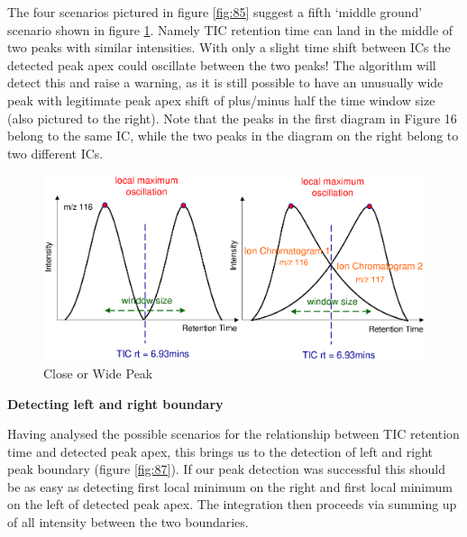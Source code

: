 The four scenarios pictured in figure \ref{fig:85} suggest a fifth ‘middle 
ground’ scenario shown in figure \ref{fig:86}. Namely TIC retention time can 
land in the middle of two peaks with similar intensities. With only a slight 
time shift between ICs the detected peak apex could oscillate between the two 
peaks! The algorithm will detect this and raise a warning, as it is still 
possible to have an unusually wide peak with legitimate peak apex shift of 
plus/minus half the time window size (also pictured to the right). Note that 
the peaks in the first diagram in Figure 16 belong to the same IC, while the 
two peaks in the diagram on the right belong to two different ICs.

\begin{figure}
  \begin{center}
    \includegraphics[scale=0.7]{graphics/chapter08/86.eps}
  \end{center}
  \caption{Close or Wide Peak}
  \label{fig:86}
\end{figure}

{\bf Detecting left and right boundary}

Having analysed the possible scenarios for the relationship between TIC 
retention time and detected peak apex, this brings us to the detection of left 
and right peak boundary (figure \ref{fig:87}). If our peak detection was 
successful this should be as easy as detecting first local minimum on the right 
and first local minimum on the left of detected peak apex. The integration then 
proceeds via summing up of all intensity between the two boundaries.

